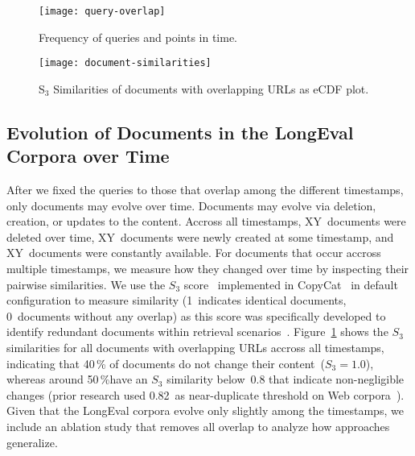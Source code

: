 

\begin{figure}[t]
    \begin{minipage}{.49\textwidth}
        \texttt{[image: query-overlap]}
        \vspace{-4ex}
        \caption{Frequency of queries and points in time.}
        \label{fig:query-overlap}
    \end{minipage}
    \hfill    
    \begin{minipage}{.49\textwidth}
        \texttt{[image: document-similarities]}
        \vspace{-4ex}
        \caption{S$_{3}$ Similarities of documents with overlapping URLs as eCDF plot.}
        \label{fig:document-similarities}
    \end{minipage}
\end{figure}

\subsection{Evolution of Documents in the LongEval Corpora over Time}

After we fixed the queries to those that overlap among the different timestamps, only documents may evolve over time. Documents may evolve via deletion, creation, or updates to the content. {\color{red} Accross all timestamps, XY~documents were deleted over time, XY~documents were newly created at some timestamp, and XY~documents were constantly available.} For documents that occur accross multiple timestamps, we measure how they changed over time by inspecting their pairwise similarities. We use the $S_{3}$ score~\cite{bernstein:2005} implemented in CopyCat~\cite{froebe:2021a} in default configuration to measure similarity (1~indicates identical documents, 0~documents without any overlap) as this score was specifically developed to identify redundant documents within retrieval scenarios~\cite{bernstein:2005}. Figure~\ref{fig:document-similarities} shows the $S_{3}$ similarities for all documents with overlapping URLs accross all timestamps, indicating that 40\,\% of documents do not change their content~($S_{3}=1.0$), whereas around 50\,\%have an $S_{3}$ similarity below~0.8 that indicate non-negligible changes (prior research used 0.82~as near-duplicate threshold on Web corpora~\cite{froebe:2021a}). Given that the LongEval corpora evolve only slightly among the timestamps, we include an ablation study that removes all overlap to analyze how approaches generalize.


